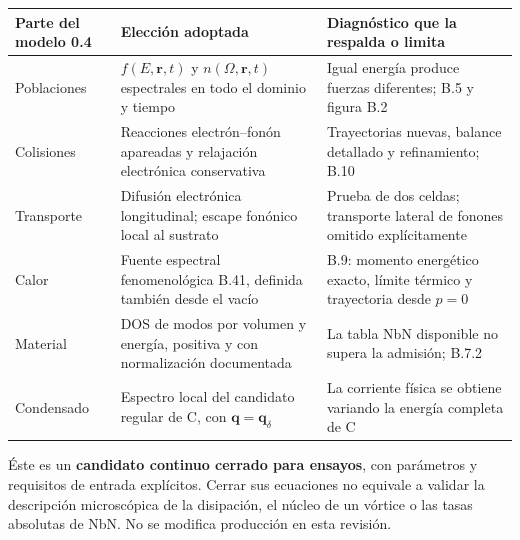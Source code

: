 \documentclass[
  spanish,
  10pt,
  a4paper,
]{article}
\newcounter{none} %
\begin{document}
{\def\LTcaptype{none} %
\begin{longtable}[]{@{}
  >{\raggedright\arraybackslash}p{}
  >{\raggedright\arraybackslash}p{}
  >{\raggedright\arraybackslash}p{}@{}}
\toprule\noalign{}
\begin{minipage}[b]{\linewidth}\raggedright
Parte del modelo 0.4
\end{minipage} & \begin{minipage}[b]{\linewidth}\raggedright
Elección adoptada
\end{minipage} & \begin{minipage}[b]{\linewidth}\raggedright
Diagnóstico que la respalda o limita
\end{minipage} \\
\midrule\noalign{}
\endhead
\bottomrule\noalign{}
\endlastfoot
Poblaciones & \(f(E,\mathbf r,t)\) y \(n(\Omega,\mathbf r,t)\)
espectrales en todo el dominio y tiempo & Igual energía produce fuerzas
diferentes; B.5 y figura B.2 \\
Colisiones & Reacciones electrón--fonón apareadas y relajación
electrónica conservativa & Trayectorias nuevas, balance detallado y
refinamiento; B.10 \\
Transporte & Difusión electrónica longitudinal; escape fonónico local al
sustrato & Prueba de dos celdas; transporte lateral de fonones omitido
explícitamente \\
Calor & Fuente espectral fenomenológica B.41, definida también desde el
vacío & B.9: momento energético exacto, límite térmico y trayectoria
desde \(p=0\) \\
Material & DOS de modos por volumen y energía, positiva y con
normalización documentada & La tabla NbN disponible no supera la
admisión; B.7.2 \\
Condensado & Espectro local del candidato regular de C, con
\(\mathbf q=\mathbf q_\delta\) & La corriente física se obtiene variando
la energía completa de C \\
\end{longtable}
}

Éste es un \textbf{candidato continuo cerrado para ensayos}, con
parámetros y requisitos de entrada explícitos. Cerrar sus ecuaciones no
equivale a validar la descripción microscópica de la disipación, el
núcleo de un vórtice o las tasas absolutas de NbN. No se modifica
producción en esta revisión.
\end{document}
